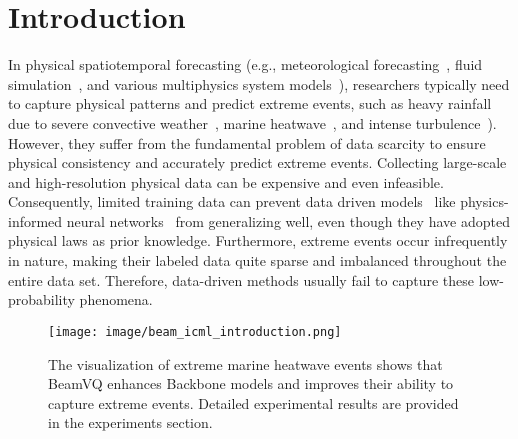 \section{Introduction}

In physical spatiotemporal forecasting (e.g., meteorological forecasting~\cite{bi2023accurate, lam2022graphcast}, fluid simulation~\cite{wu2024prometheus, wupure}, and various multiphysics system models~\cite{li2020fourier, wu2024neural}),
researchers typically need to capture physical patterns and predict extreme events,
such as heavy rainfall due to severe convective weather~\cite{ravuri2021skilful,doswell2001severe}, marine heatwave~\cite{frolicher2018marine}, and intense turbulence~\cite{moisy2004geometry}). 
However, they suffer from the fundamental problem of data scarcity to ensure physical consistency and accurately predict extreme events.
Collecting large-scale and high-resolution physical data can be expensive and even infeasible.
Consequently, limited training data can prevent data driven models~\cite{sun2020surrogate, zhu2019physics} like physics-informed neural networks~\cite{raissi2019physics} from generalizing well, even though they have adopted physical laws as prior knowledge.
Furthermore, extreme events occur infrequently in nature, making their labeled data quite sparse and imbalanced throughout the entire data set.
Therefore, data-driven methods usually fail to capture these low-probability phenomena.
\begin{figure}[t]
  \centering
  \texttt{[image: image/beam\_icml\_introduction.png]}
  \caption{The visualization of extreme marine heatwave events shows that BeamVQ enhances Backbone models and improves their ability to capture extreme events. Detailed experimental results are provided in the experiments section.}
  \label{fig:intro}
\end{figure}

